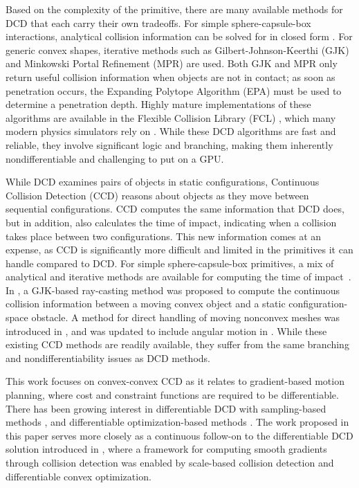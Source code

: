 Based on the complexity of the primitive, there are many available methods for DCD that each carry their own tradeoffs. For simple sphere-capsule-box interactions, analytical collision information can be solved for in closed form \cite{ericson2004}. For generic convex shapes, iterative methods such as Gilbert-Johnson-Keerthi (GJK) \cite{gilbert1988, cameron1997} and Minkowski Portal Refinement (MPR) \cite{snethen2008,newth2013} are used. Both GJK and MPR only return useful collision information when objects are not in contact; as soon as penetration occurs, the Expanding Polytope Algorithm (EPA) \cite{vandenbergen2001} must be used to determine a penetration depth. Highly mature implementations of these algorithms are available in the Flexible Collision Library (FCL) \cite{pan2012}, which many modern physics simulators rely on \cite{coumans2015,tedrake2019a,lee2018,todorov2012a}.  While these DCD algorithms are fast and reliable, they involve significant logic and branching, making them inherently nondifferentiable and challenging to put on a GPU. 
%
%

While DCD examines pairs of objects in static configurations, Continuous Collision Detection (CCD) reasons about objects as they move between sequential configurations. CCD computes the same information that DCD does, but in addition, also calculates the time of impact, indicating when a collision takes place between two configurations. This new information comes at an expense, as CCD is significantly more difficult and limited in the primitives it can handle compared to DCD. For simple sphere-capsule-box primitives, a mix of analytical and iterative methods are available for computing the time of impact~\cite{ericson2004}. In \cite{vandenbergen2004}, a GJK-based ray-casting method was proposed to compute the continuous collision information between a moving convex object and a static configuration-space obstacle. A method for direct handling of moving nonconvex meshes was introduced in \cite{zhang2006}, and was updated to include angular motion in \cite{coumans}. While these existing CCD methods are readily available, they suffer from the same branching and nondifferentiability issues as DCD methods.

This work focuses on convex-convex CCD as it relates to gradient-based motion planning, where cost and constraint functions are required to be differentiable. There has been growing interest in differentiable DCD with sampling-based methods \cite{montaut2022a}, and differentiable optimization-based methods \cite{tracy2023b,zimmermann2022,tracy2022}.  The work proposed in this paper serves more closely as a continuous follow-on to the differentiable DCD solution introduced in \cite{tracy2023b}, where a framework for computing smooth gradients through collision detection was enabled by scale-based collision detection and differentiable convex optimization. 

